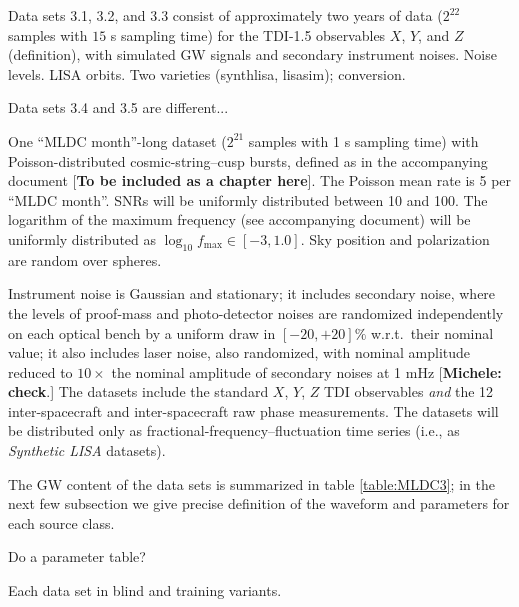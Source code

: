 \documentclass{iopart}
\begin{document}
Data sets 3.1, 3.2, and 3.3 consist of approximately two years of data ($2^{22}$ samples with $15$ s sampling time) for the TDI-1.5 observables $X$, $Y$, and $Z$ (definition), with simulated GW signals and secondary instrument noises. 
Noise levels. LISA orbits. Two varieties (synthlisa, lisasim); conversion.

Data sets 3.4 and 3.5 are different...

One ``MLDC month''-long dataset ($2^{21}$ samples with 1 s sampling time) with Poisson-distributed cosmic-string--cusp bursts, defined as in the accompanying document [\textbf{To be included as a chapter here}]. The Poisson mean rate is 5 per ``MLDC month''. SNRs will be uniformly distributed between 10 and 100. The logarithm of the maximum frequency (see accompanying document) will be uniformly distributed as $\log_{10} f_\mathrm{max} \in [-3,1.0]$. Sky position and polarization are random over spheres.

Instrument noise is Gaussian and stationary; it includes secondary noise, where the levels of proof-mass and photo-detector noises are randomized independently on each optical bench by a uniform draw in $[-20,+20]\%$ w.r.t.\ their nominal value; it also includes laser noise, also randomized, with nominal amplitude reduced to $10\times$ the nominal amplitude of secondary noises at 1 mHz [\textbf{Michele: check}.] The datasets include the standard $X$, $Y$, $Z$ TDI observables \emph{and} the 12 inter-spacecraft and inter-spacecraft raw phase measurements. The datasets will be distributed only as fractional-frequency--fluctuation time series (i.e., as \emph{Synthetic LISA} datasets).


The GW content of the data sets is summarized in table \ref{table:MLDC3}; in the next few subsection we give precise definition of the waveform and parameters for each source class.

Do a parameter table?

Each data set in blind and training variants.
\end{document}
